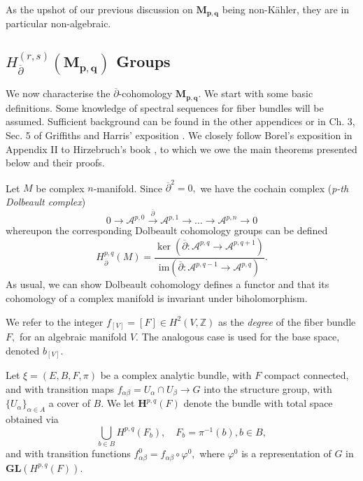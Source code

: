 \noindent As the upshot of our previous discussion on $\mathbf{M_{p,q}}$ being non-K\"ahler, they are in particular non-algebraic.



\subsection{$H_{\overline{\partial}}^{(r,s)}(\mathbf{M_{p,q}})$ Groups}

We now characterise the $\overline\partial$-cohomology $\mathbf{M_{p,q}}.$ We start with some basic definitions. Some knowledge of spectral sequences for fiber bundles will be assumed. Sufficient background can be found in the other appendices or in Ch. 3, Sec. 5 of Griffiths and Harris' exposition \cite{griffithsPrinciplesAlgebraicGeometry1978}. We closely follow Borel's exposition in Appendix II to Hirzebruch's book \cite{Hirzebruch}, to which we owe the main theorems presented below and their proofs.

\begin{definition}
    Let $M$ be complex $n$-manifold. Since $\overline{\partial}^2 = 0,$ we have the cochain complex (\textit{p-th Dolbeault complex})
    \[
    0 \rightarrow \mathcal{A}^{p,0} \xrightarrow{\overline\partial} \mathcal{A}^{p,1} \rightarrow \dots \rightarrow\mathcal{A}^{p,n} \rightarrow 0
    \]
    whereupon the corresponding Dolbeault cohomology groups can be defined
    \[
    H^{p,q}_{\overline \partial}(M) = \frac{\ker (\overline\partial: \mathcal{A}^{p,q} \rightarrow \mathcal{A}^{p,q+1})}{\mathrm{im} (\overline\partial: \mathcal{A}^{p,q-1} \rightarrow \mathcal{A}^{p,q})}.
    \]
    As usual, we can show Dolbeault cohomology defines a functor and that its cohomology of a complex manifold is invariant under biholomorphism.
\end{definition}


\begin{definition}
    We refer to the integer $f_{[V]} = [F] \in  H^2(V, \mathbb{Z})$ as the \textit{degree} of the fiber bundle $F,$ for an algebraic manifold $V.$ The analogous case is used for the base space, denoted $b_{[V]}$.
\end{definition}

\begin{definition}
    Let $\xi = (E,B,F,\pi)$ be a complex analytic bundle, with $F$ compact connected, and with transition maps $f_{\alpha\beta} = U_\alpha \cap U_\beta \to G$ into the structure group, with $\{U_\alpha\}_{\alpha\in A}$ a cover of $B.$  We let $\mathbf{H}^{p,q}(F)$ denote the bundle with total space obtained via 
    \[
    \bigcup_{b\in B}H^{p,q}(F_b), \quad F_b = \pi^{-1}(b), b\in B,
    \]
    and with transition functions $f^0_{\alpha\beta} = f_{\alpha\beta}\circ \varphi^0,$ where $\varphi^0$ is a representation of $G$ in $\mathbf{GL}(H^{p,q}(F)).$
\end{definition}

